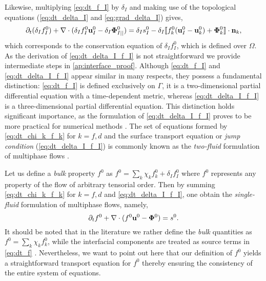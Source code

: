Likewise, multiplying \ref{eq:dt_f_I} by $\delta_I$ and making use of the topological equations (\ref{eq:dt_delta_I} and \ref{eq:grad_delta_I}) gives,
\begin{equation}
    \partial_t (\delta_If_I^0)  
    + \mathbf{\nabla}\cdot (
        \delta_I f_I^0 \textbf{u}_I^0
        - \delta_I \mathbf{\Phi}_{I||}^0 
        )
    = 
    \delta_Is_I^0
    - \delta_I\llbracket 
    f_k^0 (\textbf{u}_I^0 - \textbf{u}_k^0)
    + \mathbf{\Phi}_k^0 \rrbracket \cdot \textbf{n}_k,
    \label{eq:dt_delta_I_f_I}
\end{equation}
which corresponds to the conservation equation of $\delta_If_I^0$, which is defined over $\Omega$.
As the derivation of \ref{eq:dt_delta_I_f_I} is not straightforward we provide intermediate steps in \ref{ap:interface_proof}. 
Although \ref{eq:dt_f_I} and \ref{eq:dt_delta_I_f_I} appear similar in many respects, they possess a fundamental distinction: \ref{eq:dt_f_I} is defined exclusively on $\Gamma$, it is a two-dimensional partial differential equation with a time-dependent metric, whereas \ref{eq:dt_delta_I_f_I} is a three-dimensional partial differential equation. 
This distinction holds significant importance, as the formulation of \ref{eq:dt_delta_I_f_I} proves to be more practical for numerical methods \citep{scorsim2021particle}. 
The set of equations formed by \ref{eq:dt_chi_k_f_k} for $k = f,d$ and the surface transport equation or \textit{jump condition} (\ref{eq:dt_delta_I_f_I}) is commonly known as the \textit{two-fluid} formulation of multiphase flows \citep{morel2015mathematical,tryggvason2011direct,drew1983mathematical,kataoka1986local}. 

Let us define a \textit{bulk} property $f^0$ as $f^0 = \sum_{k} \chi_k f_k^0 + \delta_I f_I^0$ where $f^0$ represents any property of the flow of arbitrary tensorial order.
Then by summing \ref{eq:dt_chi_k_f_k} for $k=f,d$ and \ref{eq:dt_delta_I_f_I}, one obtain the \textit{single-fluid} formulation of multiphase flows, namely,
\begin{equation}
   \partial_t f^0
   + \mathbf{\nabla}\cdot (
       f^0 \textbf{u}^0
       -  \mathbf{\Phi}^0 
    )
   = s^0. 
   \label{eq:dt_f}
\end{equation}
It should be noted that in the literature we rather define the \textit{bulk} quantities as $f^0 = \sum_k \chi_k f_k^0$, while the interfacial components are treated as source terms in \ref{eq:dt_f} \citep{morel2015mathematical,tryggvason2011direct,drew1983mathematical}. 
Nevertheless, we want to point out here that our definition of $f^0$ yields a straightforward transport equation for $f^0$ thereby ensuring the consistency of the entire system of equations.



